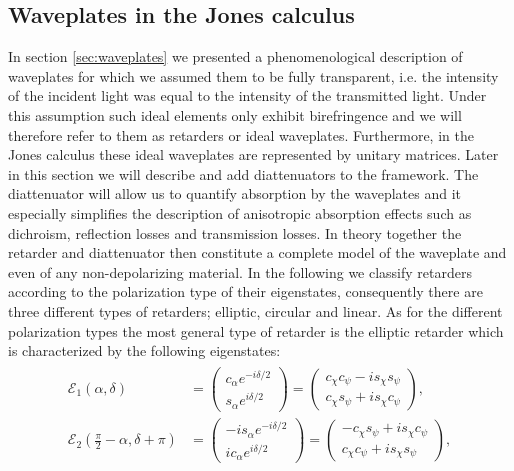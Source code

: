 \subsection{Waveplates in the Jones calculus}
In section \ref{sec:waveplates} we presented a phenomenological description of waveplates for which we assumed them to be fully transparent, i.e. the intensity of the incident light was equal to the intensity of the transmitted light. Under this assumption such ideal elements only exhibit birefringence and we will therefore refer to them as retarders or ideal waveplates. Furthermore, in the Jones calculus these ideal waveplates are represented by unitary matrices. Later in this section we will describe and add diattenuators to the framework. The diattenuator will allow us to quantify absorption by the waveplates and it especially simplifies the description of anisotropic absorption effects such as dichroism, reflection losses and transmission losses. In theory together the retarder and diattenuator then constitute a complete model of the waveplate and even of any non-depolarizing material. In the following we classify retarders according to the polarization type of their eigenstates, consequently there are three different types of retarders; elliptic, circular and linear. As for the different polarization types the most general type of retarder is the elliptic retarder which is characterized by the following eigenstates:
\begin{align}
\begin{split}
    \label{eq:ellip_pol_eigenstates}
    \bm{\mathcal{E}}_1(\alpha, \delta) &= 
    \begin{pmatrix} c_{\alpha} e^{-i\delta /2} \\ s_{\alpha} e^{i\delta /2} \end{pmatrix}
    = 
    \begin{pmatrix} c_{\chi} c_{\psi} - i s_{\chi} s_{\psi} \\ 
    c_{\chi} s_{\psi} + i s_{\chi} c_{\psi} \end{pmatrix},
    \\
    \bm{\mathcal{E}}_2 \left( \frac{\pi}{2} - \alpha, \delta+\pi \right) &= 
    \begin{pmatrix} -i s_{\alpha} e^{-i\delta /2} \\ i c_{\alpha} e^{i\delta /2} \end{pmatrix}
    = 
    \begin{pmatrix} -c_{\chi} s_{\psi} + i s_{\chi} c_{\psi} \\ 
    c_{\chi} c_{\psi} + i s_{\chi} s_{\psi} \end{pmatrix},
\end{split}
\end{align}
